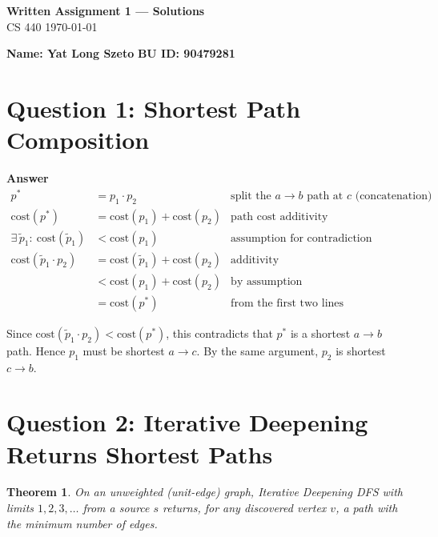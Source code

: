 \documentclass[11pt]{article}
\newtheorem{theorem}{Theorem}
\theoremstyle{definition}
\theoremstyle{remark}
\begin{document}
\begin{center}
{\Large \textbf{Written Assignment 1 — Solutions}}\\[0.25em]
CS 440 \quad \today
\end{center}

\noindent\textbf{Name: Yat Long Szeto} \quad
\textbf{BU ID:  90479281} 

\bigskip

\section*{Question 1: Shortest Path Composition}

\noindent\textbf{Answer}\\
\begin{align*}
p^\ast &= p_1 \cdot p_2 &\text{split the $a\!\to\! b$ path at $c$ (concatenation)}\\
\text{cost}(p^\ast) &= \text{cost}(p_1) + \text{cost}(p_2) &\text{path cost additivity}\\
\exists\,\tilde p_1:\ \text{cost}(\tilde p_1) &< \text{cost}(p_1) &\text{assumption for contradiction}\\
\text{cost}(\tilde p_1\!\cdot\! p_2) &= \text{cost}(\tilde p_1) + \text{cost}(p_2) &\text{additivity}\\
&< \text{cost}(p_1) + \text{cost}(p_2) &\text{by assumption}\\
&= \text{cost}(p^\ast) &\text{from the first two lines}
\end{align*}

Since $\text{cost}(\tilde p_1\!\cdot\! p_2) < \text{cost}(p^\ast)$, 
this contradicts that $p^\ast$ is a shortest $a\!\to\! b$ path. 
Hence $p_1$ must be shortest $a\!\to\! c$. By the same argument, $p_2$ is shortest $c\!\to\! b$.


\section*{Question 2: Iterative Deepening Returns Shortest Paths}

\begin{theorem}
On an unweighted (unit-edge) graph, Iterative Deepening DFS with limits $1,2,3,\dots$ from a source $s$ returns, for any discovered vertex $v$, a path with the minimum number of edges.
\end{theorem}
\end{document}
